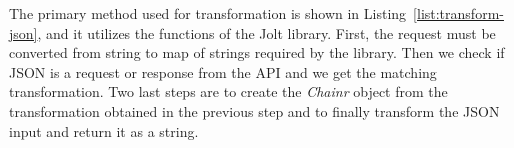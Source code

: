 

The primary method used for transformation is shown in Listing~\ref{list:transform-json}, and it utilizes the functions of the Jolt library. First, the request must be converted from string to map of strings required by the library. Then we check if JSON is a request or response from the API and we get the matching transformation. Two last steps are to create the \textit{Chainr} object from the transformation obtained in the previous step and to finally transform the JSON input and return it as a string.



